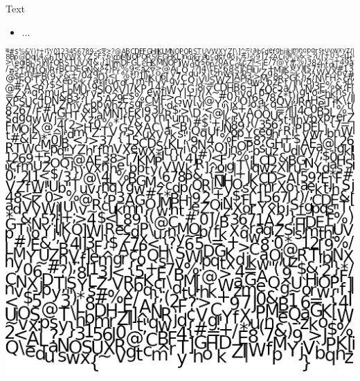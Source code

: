 \documentclass{lug}
\begin{document}
\begin{frame}{Text}
    \noindent
    \begin{minipage}{.75\textwidth - 2em}
        \small
        \begin{itemize}
            \item ...
        \end{itemize}
    \end{minipage}%
    \hspace{1.5em}%
    \begin{minipage}{.25\textwidth}
        \includegraphics[width=\textwidth]{graphics/freetype_atlas}
    \end{minipage}
\end{frame}
\end{document}
